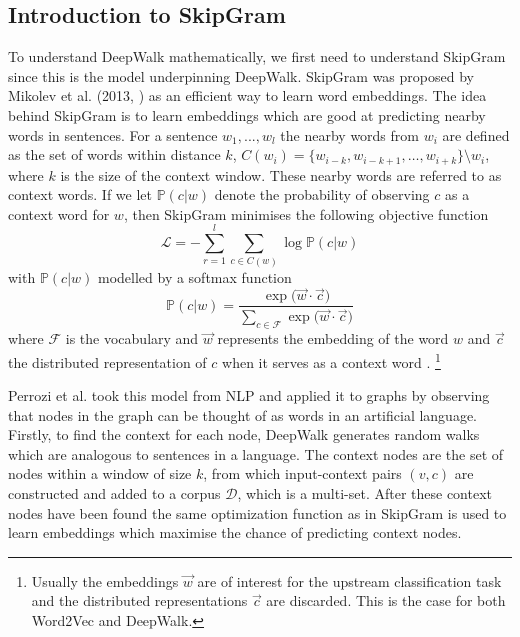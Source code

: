 \documentclass[a4paper]{article}
\renewcommand{\P}{\mathbb P}
\newcommand{\D}{\mathcal D}
\begin{document}
\subsection{Introduction to SkipGram}
To understand DeepWalk mathematically, we first need to understand SkipGram since this is the model underpinning DeepWalk. SkipGram was
proposed by Mikolev et al. (2013, \cite{mikolov2013efficient}) as an efficient way to
learn word embeddings. The idea behind SkipGram is to learn embeddings which are good at
predicting nearby words in sentences. For a sentence $w_1, ... , w_l$ the
nearby words from $w_i$ are defined as the set of words
within distance $k$, $C(w_i) = \{w_{i-k}, w_{i-k+1}, \dots , w_{i+k}\} \setminus w_i$, where $k$ is the size of the context window. These nearby words are referred to as context words. If we let $\P(c|w)$ denote the probability of observing $c$ as a context word for $w$, then SkipGram
minimises the following objective function
\[\mathcal{L} = - \sum_{r = 1}^{l} \sum_{c \in C(w)} \log{\P(c | w)}\]
with $\P(c | w)$ modelled by a softmax function
\[\P(c|w) = \frac{\exp{(\vec{w} \cdot \vec{c}})}{\sum_{c \in \mathcal{F}}\exp{(\vec{w} \cdot
    \vec{c}})}\]
where $\mathcal{F}$ is the vocabulary and $\vec{w}$ represents the
embedding of the word $w$ and $\vec{c}$ the distributed representation of $c$ when it serves as a
context word \cite{mikolov2013efficient, mikolov2013distributed}.
\footnote{Usually the embeddings $\vec{w}$ are of interest for the upstream classification task and the distributed representations $\vec{c}$ are discarded. This is the case for both Word2Vec and DeepWalk.}

Perrozi et al. took this model from NLP and applied it to graphs by observing
that nodes in the graph can be thought of as words in an artificial language.
Firstly, to find the context for each node, DeepWalk generates random walks
which are analogous to sentences in a language. The context nodes are the set of
nodes within a window of size $k$, from which input-context pairs $(v, c)$ are
constructed and added to a corpus $\D$, which is a multi-set. After these context nodes have been
found the same optimization function as in SkipGram is used to learn embeddings which maximise
the chance of predicting context nodes.
\end{document}
